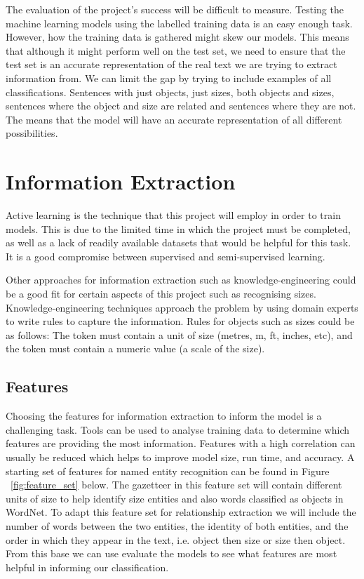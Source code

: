 \documentclass[11pt,oneside]{book}
\begin{document}
The evaluation of the project’s success will be difficult to measure. Testing the machine learning models using the labelled training data is an easy enough task. However, how the training data is gathered might skew our models. This means that although it might perform well on the test set, we need to ensure that the test set is an accurate representation of the real text we are trying to extract information from. We can limit the gap by trying to include examples of all classifications. Sentences with just objects, just sizes, both objects and sizes, sentences where the object and size are related and sentences where they are not. The means that the model will have an accurate representation of all different possibilities.

\section{Information Extraction}

Active learning is the technique that this project will employ in order to train models. This is due to the limited time in which the project must be completed, as well as a lack of readily available datasets that would be helpful for this task. It is a good compromise between supervised and semi-supervised learning.

Other approaches for information extraction such as knowledge-engineering could be a good fit for certain aspects of this project such as recognising sizes. Knowledge-engineering techniques approach the problem by using domain experts to write rules to capture the information. Rules for objects such as sizes could be as follows: The token must contain a unit of size (metres, m, ft, inches, etc), and the token must contain a numeric value (a scale of the size).

\subsection{Features}
Choosing the features for information extraction to inform the model is a challenging task. Tools can be used to analyse training data to determine which features are providing the most information. Features with a high correlation can usually be reduced which helps to improve model size, run time, and accuracy. A starting set of features for named entity recognition can be found in Figure ~\ref{fig:feature_set} below. The gazetteer in this feature set will contain different units of size to help identify size entities and also words classified as objects in WordNet. To adapt this feature set for relationship extraction we will include the number of words between the two entities, the identity of both entities, and the order in which they appear in the text, i.e. object then size or size then object. From this base we can use evaluate the models to see what features are most helpful in informing our classification.
\end{document}
